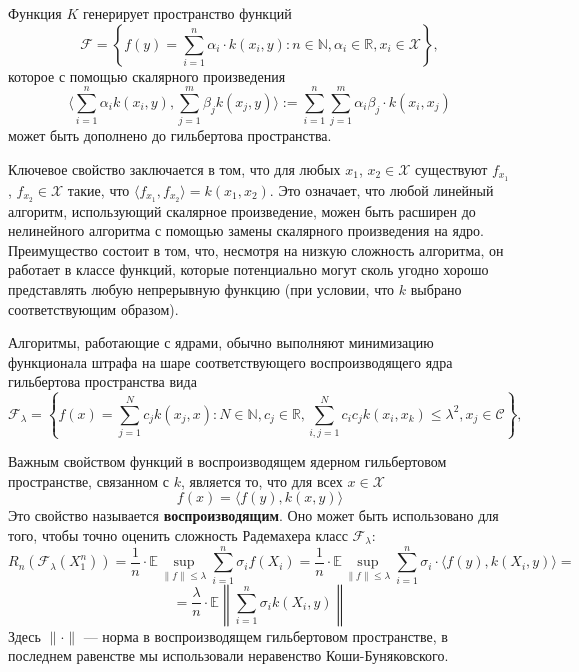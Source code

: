 \documentclass[12pt]{article}
\begin{document}
Функция $K$ генерирует пространство функций
\begin{equation*}
	\mathcal{F}=\left\{f(y)=\sum\limits_{i=1}^{n}\alpha_i\cdot k(x_i,y): n\in\mathbb{N}, \alpha_i\in\mathbb{R}, x_i\in\mathcal{X}\right\},
\end{equation*}
которое с помощью скалярного произведения
\begin{equation*}
	\langle\sum\limits_{i=1}^{n}\alpha_ik(x_i,y),\sum\limits_{j=1}^{m}\beta_jk(x_j,y)\rangle:=\sum\limits_{i=1}^{n}\sum\limits_{j=1}^{m}\alpha_i\beta_j\cdot k(x_i,x_j)
\end{equation*}
может быть дополнено до гильбертова пространства.

Ключевое свойство заключается в том, что для любых $x_1$, $x_2\in\mathcal{X}$ существуют $f_{x_1}$, $f_{x_2}\in\mathcal{X}$ такие, что $\langle f_{x_1},f_{x_2}\rangle=k(x_1,x_2)$. Это означает, что любой линейный алгоритм, использующий скалярное произведение, можен быть расширен до нелинейного алгоритма с помощью замены скалярного произведения на ядро. Преимущество состоит в том, что, несмотря на низкую сложность алгоритма, он работает в классе функций, которые потенциально могут сколь угодно хорошо представлять любую непрерывную функцию (при условии, что $k$ выбрано соответствующим образом).

Алгоритмы, работающие с ядрами, обычно выполняют минимизацию функционала штрафа на шаре соответствующего воспроизводящего ядра гильбертова пространства вида
\begin{equation*}
	\mathcal{F}_\lambda=\left\{f(x)=\sum\limits_{j=1}^{N}c_jk(x_j,x): N\in\mathbb{N}, c_j\in\mathbb{R}, \sum\limits_{i,j=1}^{N}c_ic_jk(x_i,x_k)\leqslant\lambda^2, x_j\in\mathcal{C}\right\},
\end{equation*}


Важным свойством функций в воспроизводящем ядерном гильбертовом пространстве, связанном с $k$, является то, что для всех $x\in\mathcal{X}$
\begin{equation*}
	f(x)=\langle f(y),k(x,y)\rangle
\end{equation*}
Это свойство называется \textbf{воспроизводящим}. Оно может быть использовано для того, чтобы точно оценить сложность Радемахера класс $\mathcal{F}_\lambda$:
\begin{equation*}
	R_n(\mathcal{F}_\lambda(X_1^n))=\frac{1}{n}\cdot\mathbb{E}\sup\limits_{\|f\|\leqslant\lambda}\sum\limits_{i=1}^{n}\sigma_if(X_i)=\frac{1}{n}\cdot\mathbb{E}\sup\limits_{\|f\|\leqslant\lambda}\sum\limits_{i=1}^{n}\sigma_i\cdot\langle f(y),k(X_i,y)\rangle=
\end{equation*}
\begin{equation*}
	=\frac{\lambda}{n}\cdot\mathbb{E}\left\|\sum\limits_{i=1}^{n}\sigma_ik(X_i,y)\right\|
\end{equation*}
Здесь $\|\cdot\|$ --- норма в воспроизводящем гильбертовом пространстве, в последнем равенстве мы использовали неравенство Коши-Буняковского.
\end{document}
